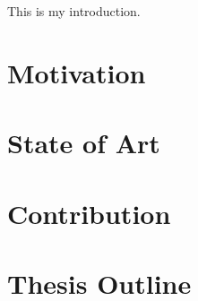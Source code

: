 This is my introduction.
\section{Motivation}

\section{State of Art}

\section{Contribution}

\section{Thesis Outline}


